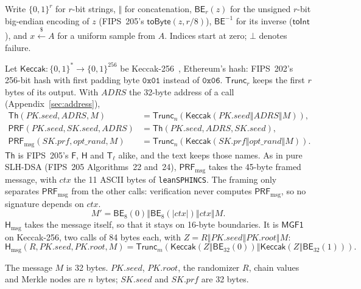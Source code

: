 \documentclass[11pt]{article}
\newcommand{\bits}[1]{\{0,1\}^{#1}}
\newcommand{\getsr}{\stackrel{\$}{\gets}}
\newcommand{\keccak}{\mathsf{Keccak}}
\newcommand{\Th}{\mathsf{Th}}
\newcommand{\PRF}{\mathsf{PRF}}
\newcommand{\PRFmsg}{\mathsf{PRF}_{\mathrm{msg}}}
\newcommand{\Hmsg}{\mathsf{H}_{\mathrm{msg}}}
\newcommand{\BE}{\mathsf{BE}}
\newcommand{\Truncate}{\mathsf{Trunc}}
\newcommand{\concat}{\mathbin\Vert}
\newcommand{\pkseed}{\mathit{PK.seed}}
\newcommand{\pkroot}{\mathit{PK.root}}
\newcommand{\skseed}{\mathit{SK.seed}}
\newcommand{\skprf}{\mathit{SK.prf}}
\newcommand{\addr}{\mathit{ADRS}}
\begin{document}
Write $\bits r$ for $r$-bit strings, $\concat$ for concatenation, $\BE_r(z)$ for the unsigned $r$-bit big-endian encoding of $z$ (FIPS~205's $\mathsf{toByte}(z,r/8)$), $\BE^{-1}$ for its inverse ($\mathsf{toInt}$), and $x\getsr A$ for a uniform sample from $A$. Indices start at zero; $\bot$ denotes failure.

Let $\keccak:\bits{*}\to\bits{256}$ be Keccak-256~\cite{keccak}, Ethereum's hash: FIPS~202's~\cite{fips202} 256-bit hash with first padding byte $\mathtt{0x01}$ instead of $\mathtt{0x06}$. $\Truncate_r$ keeps the first $r$ bytes of its output. With $\addr$ the 32-byte address of a call (Appendix~\ref{sec:address}),
\[
\begin{aligned}
  \Th(\pkseed,\addr,M)&=\Truncate_n\!\left(\keccak(\pkseed\concat\addr\concat M)\right),\\
  \PRF(\pkseed,\skseed,\addr)&=\Th(\pkseed,\addr,\skseed),\\
  \PRFmsg(\skprf,\mathit{opt\_rand},M)&=\Truncate_n\!\left(\keccak(\skprf\concat\mathit{opt\_rand}\concat M)\right).
\end{aligned}
\]
$\Th$ is FIPS~205's $\mathsf F$, $\mathsf H$ and $\mathsf T_\ell$ alike, and the text keeps those names. As in pure SLH-DSA (FIPS~205 Algorithms~22 and~24), $\PRFmsg$ takes the 45-byte framed message, with $\mathit{ctx}$ the 11 ASCII bytes of \texttt{leanSPHINCS}. The framing only separates $\PRFmsg$ from the other calls: verification never computes $\PRFmsg$, so no signature depends on $\mathit{ctx}$.
\[
  M'=\BE_8(0)\concat\BE_8(|\mathit{ctx}|)\concat\mathit{ctx}\concat M.
\]
$\Hmsg$ takes the message itself, so that it stays on 16-byte boundaries. It is $\mathsf{MGF1}$~\cite{RFC8017} on Keccak-256, two calls of 84 bytes each, with $Z=R\concat\pkseed\concat\pkroot\concat M$:
\[
  \Hmsg(R,\pkseed,\pkroot,M)=\Truncate_m\!\left(\keccak(Z\concat\BE_{32}(0))\concat\keccak(Z\concat\BE_{32}(1))\right).
\]

The message $M$ is 32 bytes. $\pkseed$, $\pkroot$, the randomizer $R$, chain values and Merkle nodes are $n$ bytes; $\skseed$ and $\skprf$ are 32 bytes.
\end{document}
